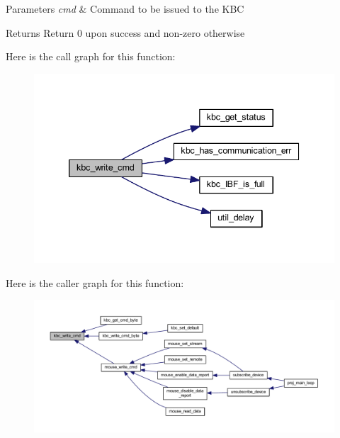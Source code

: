 \begin{DoxyParams}{Parameters}
{\em cmd} & Command to be issued to the K\+BC \\
\hline
\end{DoxyParams}
\begin{DoxyReturn}{Returns}
Return 0 upon success and non-\/zero otherwise 
\end{DoxyReturn}
Here is the call graph for this function\+:\nopagebreak
\begin{figure}[H]
\begin{center}
\leavevmode
\includegraphics[width=339pt]{group__keyboard_gaa1dcd642657d7da0376e36cda809b0e3_cgraph}
\end{center}
\end{figure}
Here is the caller graph for this function\+:\nopagebreak
\begin{figure}[H]
\begin{center}
\leavevmode
\includegraphics[width=350pt]{group__keyboard_gaa1dcd642657d7da0376e36cda809b0e3_icgraph}
\end{center}
\end{figure}
\mbox{\label{group__keyboard_gab18be1772193037a82088027884ef917}} 
